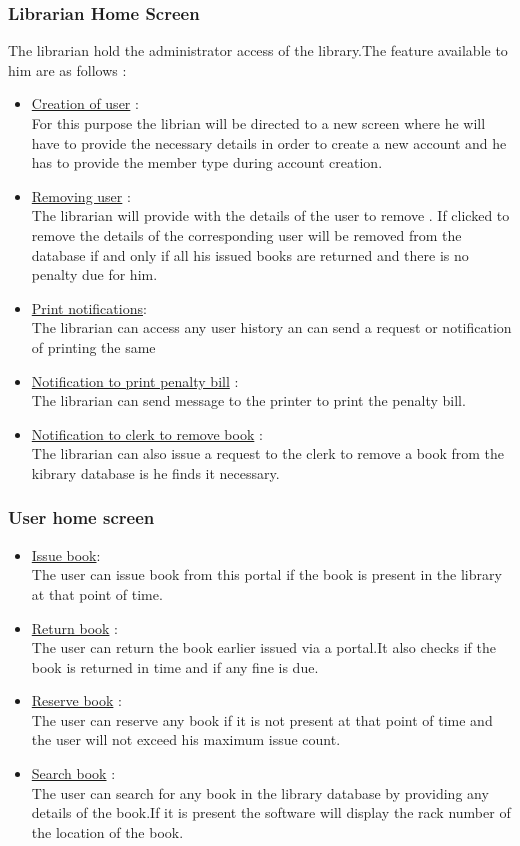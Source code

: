 \documentclass{article}
\begin{document}
\subsubsection*{Librarian Home Screen}
The librarian hold the administrator access of the library.The feature available to him are as follows :
\begin{itemize}
\item \underline{Creation of user} :\\
For this purpose the librian will be directed to a new screen where he will have to provide the necessary details in order to create a new account and he has to provide the member type during account creation.
\item \underline{Removing user} : \\
The librarian will provide with the details of the user to remove . If clicked to remove the details of the corresponding user will be removed from the database if and only if all his issued books are returned and there is no penalty due for him.
\item \underline{Print notifications}:\\ The librarian can access any user history an can send a request or notification of printing the same
\item \underline{Notification to print penalty bill} :\\ The librarian can send message to the printer to print the penalty bill.
\item \underline{Notification to clerk to remove book} :\\
The librarian can also issue a request to the clerk to remove a book from the kibrary database is he finds it necessary.
\end{itemize}

\subsubsection*{User home screen}
\begin{itemize}
\item \underline{Issue book}:\\
The user can issue book from this portal if the book is present in the library at that point of time.
\item \underline{Return book} :\\ The user can return the book earlier issued via a portal.It also checks if the book is returned in time and if any fine is due.
\item \underline{Reserve book} :\\ The user can reserve any book if it is not present at that point of time and the user will not exceed his maximum issue count.
\item \underline{Search book} :\\ The user can search for any book in the library database by providing any details of the book.If it is present the software will display the rack number of the location of the book.

\end{itemize}
\end{document}
